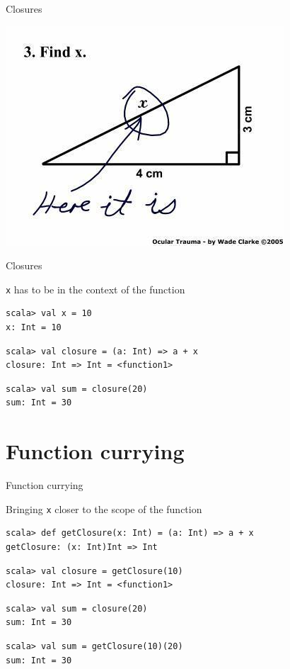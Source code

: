 \begin{frame}{Closures}
\begin{center}
\includegraphics{resources/FindX.jpg}
\end{center}
\end{frame}

\begin{frame}[fragile]{Closures}
\begin{exampleblock}{\lstinline!x! has to be in the context of the function}
\begin{lstlisting}
scala> val x = 10
x: Int = 10
\end{lstlisting}
\pause
\begin{lstlisting}
scala> val closure = (a: Int) => a + x
closure: Int => Int = <function1>
\end{lstlisting}
\pause
\begin{lstlisting}
scala> val sum = closure(20)
sum: Int = 30
\end{lstlisting}
\end{exampleblock}
\end{frame}

\section{Function currying}
\begin{frame}[fragile]{Function currying}
\pause
\begin{exampleblock}{Bringing \lstinline!x! closer to the scope of the function}
\begin{lstlisting}
scala> def getClosure(x: Int) = (a: Int) => a + x
getClosure: (x: Int)Int => Int
\end{lstlisting}
\pause
\begin{lstlisting}
scala> val closure = getClosure(10)
closure: Int => Int = <function1>
\end{lstlisting}
\pause
\begin{lstlisting}
scala> val sum = closure(20)
sum: Int = 30
\end{lstlisting}
\pause
\begin{lstlisting}
scala> val sum = getClosure(10)(20)
sum: Int = 30
\end{lstlisting}
\end{exampleblock}
\end{frame}

